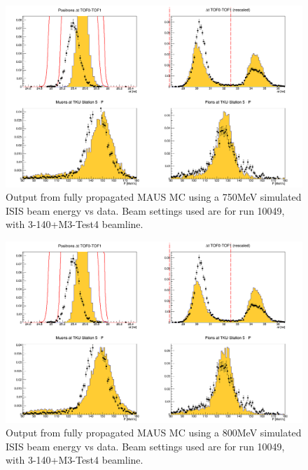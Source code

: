\documentclass[a4paper,11pt]{article}
\begin{document}
\begin{figure}
  \begin{center}
    \includegraphics[width=1.0\columnwidth]{./figures/3-140+M3-Test4_750MeV_RecoMC_data.png}
    \caption{Output from fully propagated MAUS MC using a 750MeV simulated ISIS beam energy vs data. Beam settings used are for run 10049, with 3-140+M3-Test4 beamline.}
    \label{fig:MAUSOutput3}
  \end{center}
\end{figure}

\begin{figure}
  \begin{center}
    \includegraphics[width=1.0\columnwidth]{./figures/3-140+M3-Test4_800MeV_RecoMC_data.png}
    \caption{Output from fully propagated MAUS MC using a 800MeV simulated ISIS beam energy vs data. Beam settings used are for run 10049, with 3-140+M3-Test4 beamline.}
    \label{fig:MAUSOutput4}
  \end{center}
\end{figure}
\end{document}
